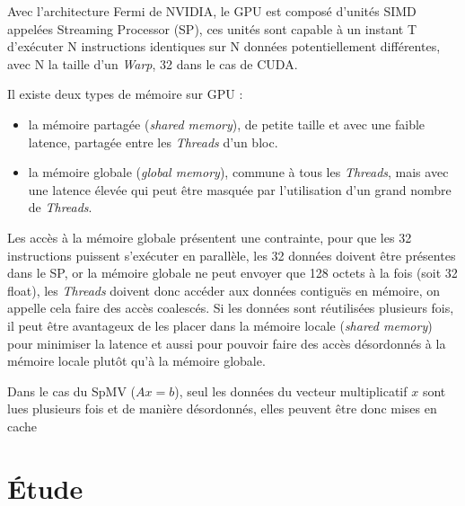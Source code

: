 \documentclass[renpar]{compas2013}
\begin{document}
  
  Avec l'architecture Fermi de NVIDIA, 
  le GPU est composé d'unités SIMD appelées Streaming Processor (SP), ces
  unités sont capable à un instant T d'exécuter N instructions
  identiques sur N données potentiellement différentes, avec N la
  taille d'un \textit{Warp}, 32 dans le cas de CUDA.

  Il existe deux types de mémoire sur GPU :
  \begin{itemize}
  \item la mémoire partagée (\textit{shared memory}), de petite taille et avec une faible
    latence, partagée entre les \textit{Threads} d'un bloc.
  \item la mémoire globale (\textit{global memory}), commune à tous les \textit{Threads}, mais avec une
    latence élevée qui peut être masquée par l'utilisation
    d'un grand nombre de \textit{Threads}.
  \end{itemize}

  Les accès à
  la mémoire globale présentent une contrainte, pour que les 32
  instructions puissent s'exécuter en parallèle, les 32 données doivent
  être présentes dans le SP, or la mémoire globale ne peut envoyer que 128 octets à
  la fois (soit 32 float), les \textit{Threads} doivent donc accéder aux données contiguës en
  mémoire, on appelle cela faire des accès coalescés. Si les données sont
  réutilisées plusieurs fois, il peut être avantageux de les placer
  dans la mémoire locale (\textit{shared memory}) pour minimiser la latence et aussi pour pouvoir faire
  des accès désordonnés à la mémoire locale plutôt qu'à la mémoire globale.

  Dans le cas du SpMV ($Ax=b$), seul les données du vecteur multiplicatif $x$ sont
  lues plusieurs fois et de manière désordonnés, elles peuvent être donc
  mises en cache

  \section{Étude}
\end{document}
